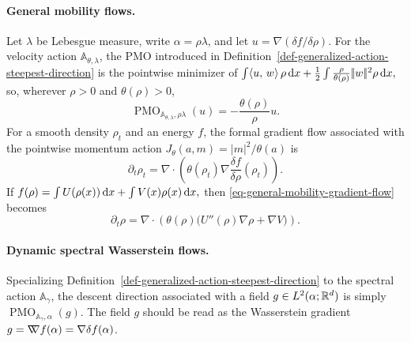 \paragraph{General mobility flows.}
Let \(\lambda\) be Lebesgue measure, write \(\alpha=\rho\lambda\), and let \(u=\nabla(\delta f/\delta\rho)\). For the velocity action \(\mathbb A_{\theta,\lambda}\), the PMO introduced in Definition~\ref{def-generalized-action-steepest-direction} is the pointwise minimizer of
\(\int \langle u,\,w\rangle\,\rho\,\mathrm{d} x + \frac12\int \frac{\rho}{\theta(\rho)}|\!| w |\!|^2\rho\,\mathrm{d} x,\)
so, wherever \(\rho>0\) and \(\theta(\rho)>0\),
\begin{equation}\label{eq-concave-mobility-pmo}
\operatorname{PMO}_{\mathbb A_{\theta,\lambda},\rho\lambda}(u)
=
-\frac{\theta(\rho)}{\rho}u.
\end{equation}
For a smooth density \(\rho_t\) and an energy \(f\), the formal gradient flow associated with the pointwise momentum action \(J_\theta(a,m)=|m|^2/\theta(a)\) is
\begin{equation}\label{eq-general-mobility-gradient-flow}
\partial_t\rho_t
=
\nabla\!\cdot\!\left(\theta(\rho_t)\nabla\frac{\delta f}{\delta\rho}(\rho_t)\right).
\end{equation}
If
\(f(\rho)=\int U(\rho(x))\,\mathrm{d} x+\int V(x)\rho(x)\,\mathrm{d} x,\)
then \eqref{eq-general-mobility-gradient-flow} becomes
\[
\partial_t\rho
=
\nabla\!\cdot\!\left(\theta(\rho)\big(U''(\rho)\nabla\rho+\nabla V\big)\right).
\]
\paragraph{Dynamic spectral Wasserstein flows.}\label{sec-normalized-spectral-wasserstein-dynamics}
Specializing Definition~\ref{def-generalized-action-steepest-direction} to the spectral action \(\mathbb A_\gamma\), the descent direction associated with a field \(g\in L^2(\alpha;\mathbb{R}^d)\) is simply \(\operatorname{PMO}_{\mathbb A_\gamma,\alpha}(g)\). The field \(g\) should be read as the Wasserstein gradient \(g=\mathord{\nabla\mkern-9.3mu\nabla} f(\alpha)=\nabla\delta f(\alpha)\).


